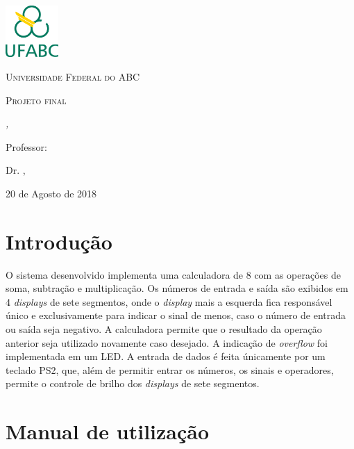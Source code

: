 \documentclass[a4paper, 12pt]{article}
\title{\titulo}
\author{\nomeAutorUm e \nomeAutorDois}
\date{\today}
\makeatletter
\newcommand{\printtitle}{
  \begin{center}
    {\Large \scshape \titulo}\\[1em]
    {\nomeAutor, \raAutor}\\  
    {\ttfamily \emailAutor}\\[0.5em]
    Professor: Dr\@. \nomeProfessor, \centroProfessor\\
    {\itshape \campusFaculdade}
  \end{center}
}
\makeatother
\begin{document}
  \begin{titlepage}
    \centering
    \includegraphics[width=0.15\textwidth]{logotipo-ufabc-abaixo.eps}\par\vspace{1cm}
    {\scshape\Large Universidade Federal do ABC \par}
    \vspace{1cm}
    {\scshape\large Projeto final \par}
    \vspace{2.5cm}
    {\LARGE\bfseries \titulo \par}
    \vspace{1cm}
    {\large\itshape \nomeAutor, \raAutor \par}
    \vfill
    Professor: \par
    Dr\@. \nomeProfessor, \centroProfessor \par
    \vfill
    {\large\itshape \campusFaculdade\par}
    {\large 20 de Agosto de 2018 \par}
  \end{titlepage}

  \section{Introdução}

  O sistema desenvolvido implementa uma calculadora de 
  \SI{8}{\bits} com as operações de soma, subtração e
  multiplicação. Os números de entrada e saída são exibidos
  em 4 \emph{displays} de sete segmentos, onde o \emph{display}
  mais a esquerda fica responsável único e exclusivamente
  para indicar o sinal de menos, caso o número de entrada
  ou saída seja negativo. A calculadora permite que o resultado
  da operação anterior seja utilizado novamente caso desejado.
  A indicação de \emph{overflow} foi implementada em um LED.
  A entrada de dados é feita únicamente por um teclado PS2, 
  que, além de permitir entrar os números, os sinais e operadores, 
  permite o controle de brilho dos \emph{displays} de sete segmentos.

  \section{Manual de utilização}
\end{document}
